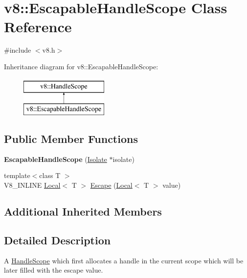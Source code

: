 \hypertarget{classv8_1_1EscapableHandleScope}{\section{v8\-:\-:Escapable\-Handle\-Scope Class Reference}
\label{classv8_1_1EscapableHandleScope}
}


{\ttfamily \#include $<$v8.\-h$>$}

Inheritance diagram for v8\-:\-:Escapable\-Handle\-Scope\-:\begin{figure}[H]
\begin{center}
\leavevmode
\includegraphics[height=2.000000cm]{classv8_1_1EscapableHandleScope}
\end{center}
\end{figure}
\subsection*{Public Member Functions}
\begin{DoxyCompactItemize}
\item 
\hypertarget{classv8_1_1EscapableHandleScope_aea39a7fd4dee6da31f3921ff891e1731}{{\bfseries Escapable\-Handle\-Scope} (\hyperlink{classv8_1_1Isolate}{Isolate} $\ast$isolate)}\label{classv8_1_1EscapableHandleScope_aea39a7fd4dee6da31f3921ff891e1731}

\item 
{\footnotesize template$<$class T $>$ }\\V8\-\_\-\-I\-N\-L\-I\-N\-E \hyperlink{classv8_1_1Local}{Local}$<$ T $>$ \hyperlink{classv8_1_1EscapableHandleScope_afdf0d3850978f65d1a827f78b3a2b6fd}{Escape} (\hyperlink{classv8_1_1Local}{Local}$<$ T $>$ value)
\end{DoxyCompactItemize}
\subsection*{Additional Inherited Members}


\subsection{Detailed Description}
A \hyperlink{classv8_1_1HandleScope}{Handle\-Scope} which first allocates a handle in the current scope which will be later filled with the escape value. 

